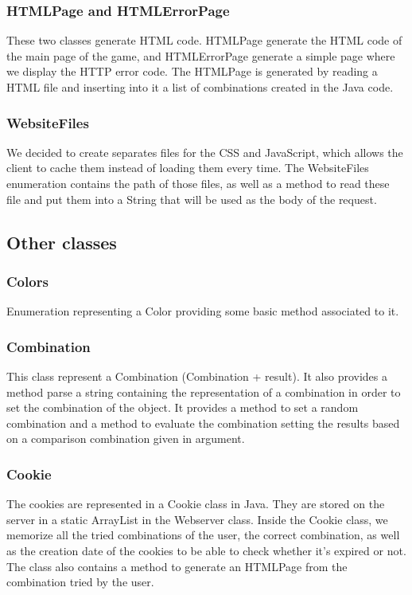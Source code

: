\documentclass[11pt]{article}
\begin{document}
\subsubsection{HTMLPage and HTMLErrorPage}
These two classes generate HTML code. HTMLPage generate the HTML code of the main page of the game, and HTMLErrorPage generate a simple page where we display the HTTP error code. The HTMLPage is generated by reading a HTML file and inserting into it a list of combinations created in the Java code. 

\subsubsection{WebsiteFiles}
We decided to create separates files for the CSS and JavaScript, which allows the client to cache them instead of loading them every time. The WebsiteFiles enumeration contains the path of those files, as well as a method to read these file and put them into a String that will be used as the body of the request.

\subsection{Other classes}

\subsubsection{Colors}
Enumeration representing a Color providing some basic method associated to it.

\subsubsection{Combination}
This class represent a Combination (Combination + result). It also provides a method parse a string containing the representation of a combination in order to set the combination of the object. It provides a method to set a random combination and a method to evaluate the combination setting the results based on a comparison combination given in argument.


\subsubsection{Cookie}
The cookies are represented in a Cookie class in Java. They are stored on the server in a static ArrayList in the Webserver class. Inside the Cookie class, we memorize all the tried combinations of the user, the correct combination, as well as the creation date of the cookies to be able to check whether it's expired or not. The class also contains a method to generate an HTMLPage from the combination tried by the user. \\
\end{document}
